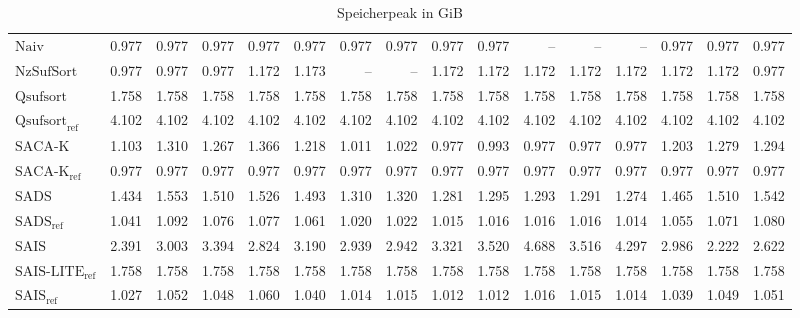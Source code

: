 \begin{table}
{\begin{tabular}{lrrrrrrrrrrrrrrr}
    $\text{Naiv}$ & {\color{green!60!black}0.977} & {\color{green!60!black}0.977} & {\color{green!60!black}0.977} & {\color{green!60!black}0.977} & {\color{green!60!black}0.977} & {\color{green!60!black}0.977} & {\color{green!60!black}0.977} & {\color{green!60!black}0.977} & {\color{green!60!black}0.977} & {\color{darkgray}--} & {\color{darkgray}--} & {\color{darkgray}--} & {\color{green!60!black}0.977} & {\color{green!60!black}0.977} & {\color{green!60!black}0.977} \\
    $\text{NzSufSort}$ & {\color{green!60!black}0.977} & {\color{green!60!black}0.977} & 0.977 & 1.172 & 1.173 & {\color{darkgray}--} & {\color{darkgray}--} & 1.172 & 1.172 & 1.172 & 1.172 & 1.172 & 1.172 & 1.172 & 0.977 \\
    $\text{Qsufsort}$ & 1.758 & 1.758 & 1.758 & 1.758 & 1.758 & 1.758 & 1.758 & 1.758 & 1.758 & 1.758 & 1.758 & 1.758 & 1.758 & 1.758 & 1.758 \\
    $\text{Qsufsort}_{\text{ref}}$ & 4.102 & 4.102 & 4.102 & 4.102 & 4.102 & 4.102 & 4.102 & 4.102 & 4.102 & 4.102 & 4.102 & 4.102 & 4.102 & 4.102 & 4.102 \\
    $\text{SACA-K}$ & 1.103 & 1.310 & 1.267 & 1.366 & 1.218 & 1.011 & 1.022 & 0.977 & 0.993 & {\color{green!60!black}0.977} & {\color{green!60!black}0.977} & {\color{green!60!black}0.977} & 1.203 & 1.279 & 1.294 \\
    $\text{SACA-K}_{\text{ref}}$ & {\color{green!60!black}0.977} & {\color{green!60!black}0.977} & {\color{green!60!black}0.977} & {\color{green!60!black}0.977} & {\color{green!60!black}0.977} & {\color{green!60!black}0.977} & {\color{green!60!black}0.977} & {\color{green!60!black}0.977} & {\color{green!60!black}0.977} & {\color{green!60!black}0.977} & {\color{green!60!black}0.977} & {\color{green!60!black}0.977} & {\color{green!60!black}0.977} & {\color{green!60!black}0.977} & {\color{green!60!black}0.977} \\
    $\text{SADS}$ & 1.434 & 1.553 & 1.510 & 1.526 & 1.493 & 1.310 & 1.320 & 1.281 & 1.295 & 1.293 & 1.291 & 1.274 & 1.465 & 1.510 & 1.542 \\
    $\text{SADS}_{\text{ref}}$ & 1.041 & 1.092 & 1.076 & 1.077 & 1.061 & 1.020 & 1.022 & 1.015 & 1.016 & 1.016 & 1.016 & 1.014 & 1.055 & 1.071 & 1.080 \\
    $\text{SAIS}$ & 2.391 & 3.003 & 3.394 & 2.824 & 3.190 & 2.939 & 2.942 & 3.321 & 3.520 & {\color{red}4.688} & 3.516 & 4.297 & 2.986 & 2.222 & 2.622 \\
    $\text{SAIS-LITE}_{\text{ref}}$ & 1.758 & 1.758 & 1.758 & 1.758 & 1.758 & 1.758 & 1.758 & 1.758 & 1.758 & 1.758 & 1.758 & 1.758 & 1.758 & 1.758 & 1.758 \\
    $\text{SAIS}_{\text{ref}}$ & 1.027 & 1.052 & 1.048 & 1.060 & 1.040 & 1.014 & 1.015 & 1.012 & 1.012 & 1.016 & 1.015 & 1.014 & 1.039 & 1.049 & 1.051 \\
\bottomrule
\end{tabular}
}
\caption{Speicherpeak in GiB}
\label{messung:tab:mem}
\end{table}
